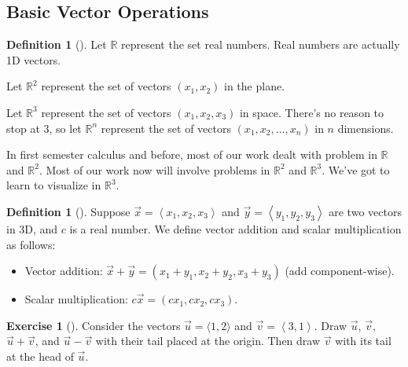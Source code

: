\documentclass[10pt,]{book}
\theoremstyle{plain}
\theoremstyle{definition}
\newtheorem{definition}[theorem]{Definition}
\theoremstyle{definition}
\theoremstyle{definition}
\theoremstyle{definition}
\newtheorem{exploration}[project]{Exercise}
\theoremstyle{definition}
\numberwithin{equation}{section}
\newcommand{\lt}{<}
\begin{document}
\subsection[{Basic Vector Operations}]{Basic Vector Operations}\label{subsection-5}
\begin{definition}[{}]\label{definition-3}
Let \(\mathbb{R}\) represent the set real numbers. Real numbers are actually 1D vectors.%
\par
Let \(\mathbb{R}^2\) represent the set of vectors \((x_1,x_2)\) in the plane.%
\par
Let \(\mathbb{R}^3\) represent the set of vectors \((x_1,x_2,x_3)\) in space. There's no reason to stop at 3, so let \(\mathbb{R}^n\) represent the set of vectors \((x_1,x_2,\ldots,x_n)\) in \(n\) dimensions.%
\end{definition}
In first semester calculus and before, most of our work dealt with problem in \(\mathbb{R}\) and \(\mathbb{R}^2\). Most of our work now will involve problems in \(\mathbb{R}^2\) and \(\mathbb{R}^3\). We've got to learn to visualize in \(\mathbb{R}^3\).%
\begin{definition}[{}]\label{def_vecadd}
Suppose \(\vec x=\left\lt x_1,x_2,x_3\right>\) and \(\vec y=\left\lt y_1,y_2,y_3\right>\) are two vectors in 3D, and \(c\) is a real number. We define vector addition and scalar multiplication as follows: \leavevmode%
\begin{itemize}[label=\textbullet]
\item{}Vector addition: \(\vec x+\vec y = (x_1+y_1,x_2+y_2,x_3+y_3)\) (add component-wise).%
\item{}Scalar multiplication: \(c\vec x = (cx_1,cx_2,cx_3)\).%
\end{itemize}
%
\end{definition}
\begin{exploration}[]\label{exploration-21}
Consider the vectors \(\vec u=\langle 1,2 \rangle\) and \(\vec v=\left\lt 3,1\right>\). Draw \(\vec u\), \(\vec v\), \(\vec u+\vec v\), and \(\vec u-\vec v\) with their tail placed at the origin. Then draw \(\vec v\) with its tail at the head of \(\vec u\).%
\end{exploration}
\end{document}
